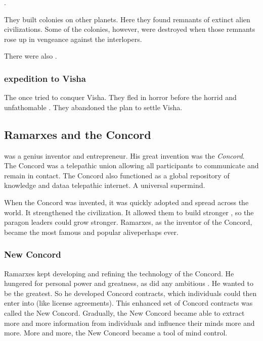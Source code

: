 \Sethicus {}. 

They built colonies on other planets. 
Here they found remnants of extinct alien civilizations.
Some of the colonies, however, were destroyed when those remnants rose up in vengeance against the \Miithian interlopers.

There were also . 





\subsubsection{\Ophidian expedition to Visha}
The \ophidians once tried to conquer Visha.
They fled in horror before the horrid and unfathomable \moongods. 
They abandoned the plan to settle Visha. 















\subsection{Ramarxes and the Concord}
 was a genius \caisith inventor and entrepreneur. 
His great invention was the \emph{Concord}. 
The Concord was a telepathic union allowing all participants to communicate and remain in contact.
The Concord also functioned as a global repository of knowledge and data\dash a telepathic internet. 
A universal \caisith supermind. 

When the Concord was invented, it was quickly adopted and spread across the world. 
It strengthened the \caisith civilization.
It allowed them to build stronger \nexuses, so the paragon leaders could grow stronger. 
Ramarxes, as the inventor of the Concord, became the most famous and popular \caisith alive\dash perhaps ever. 





\subsubsection{New Concord}
Ramarxes kept developing and refining the technology of the Concord. 
He hungered for personal power and greatness, as did any ambitious \caisith. 
He wanted to be the greatest. 
So he developed  Concord contracts, which individuals could then enter into (like license agreements). 
This enhanced set of Concord contracts was called the New Concord. 
Gradually, the New Concord became able to extract more and more information from individuals and influence their minds more and more.
More and more, the New Concord became a tool of mind control. 

